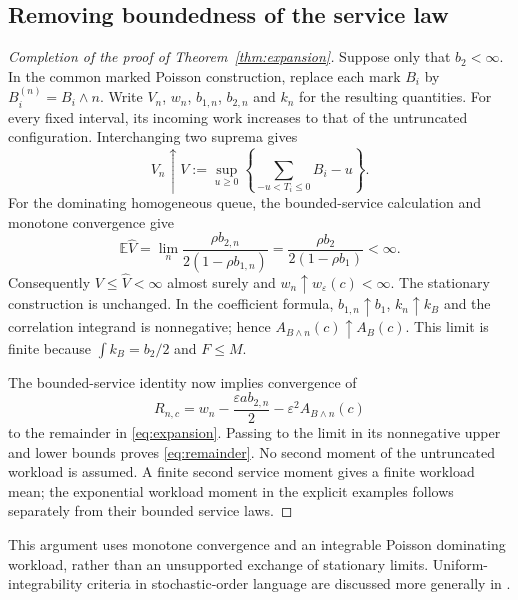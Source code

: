 \documentclass[11pt,reqno]{amsart}
\numberwithin{equation}{section}
\theoremstyle{plain}
\theoremstyle{definition}
\newcommand{\E}{\mathbb E}
\newcommand{\1}{\mathbf 1}
\newcommand{\eps}{\varepsilon}
\begin{document}
\subsection{Removing boundedness of the service law}
\begin{proof}[Completion of the proof of Theorem~\ref{thm:expansion}]
Suppose only that $b_2<\infty$. In the common marked Poisson construction, replace each mark $B_i$ by $B_i^{(n)}=B_i\wedge n$. Write $V_n$, $w_n$, $b_{1,n}$, $b_{2,n}$ and $k_n$ for the resulting quantities. For every fixed interval, its incoming work increases to that of the untruncated configuration. Interchanging two suprema gives
\[
 V_n\uparrow V:=\sup_{u\ge0}\left\{\sum_{-u<T_i\le0}B_i-u\right\}.
\]
For the dominating homogeneous queue, the bounded-service calculation and monotone convergence give
\[
 \E\widehat V
 =\lim_n\frac{\rho b_{2,n}}{2(1-\rho b_{1,n})}
 =\frac{\rho b_2}{2(1-\rho b_1)}<\infty.
\]
Consequently $V\le\widehat V<\infty$ almost surely and $w_n\uparrow w_\eps(c)<\infty$. The stationary construction is unchanged. In the coefficient formula, $b_{1,n}\uparrow b_1$, $k_n\uparrow k_B$ and the correlation integrand is nonnegative; hence $A_{B\wedge n}(c)\uparrow A_B(c)$. This limit is finite because $\int k_B=b_2/2$ and $F\le M$.

The bounded-service identity now implies convergence of
\[
 R_{n,c}=w_n-\frac{\eps a b_{2,n}}2-\eps^2A_{B\wedge n}(c)
\]
to the remainder in \eqref{eq:expansion}. Passing to the limit in its nonnegative upper and lower bounds proves \eqref{eq:remainder}. No second moment of the untruncated workload is assumed. A finite second service moment gives a finite workload mean; the exponential workload moment in the explicit examples follows separately from their bounded service laws.
\end{proof}
This argument uses monotone convergence and an integrable Poisson dominating workload, rather than an unsupported exchange of stationary limits. Uniform-integrability criteria in stochastic-order language are discussed more generally in \cite{LV13}.
\end{document}
